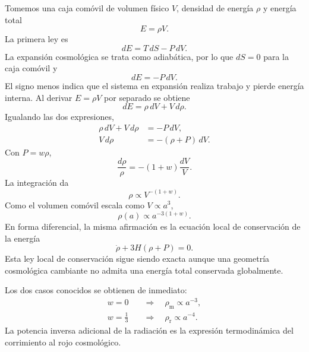 Tomemos una caja comóvil de volumen físico \(V\), densidad de energía \(\rho\) y energía total
\begin{equation}
E=\rho V.
\end{equation}
La primera ley es
\begin{equation}
dE=T\,dS-P\,dV.
\end{equation}
La expansión cosmológica se trata como adiabática, por lo que \(dS=0\) para la caja comóvil y
\begin{equation}
dE=-P\,dV.
\label{eq:c04-adiabatic-first-law}
\end{equation}
El signo menos indica que el sistema en expansión realiza trabajo y pierde energía interna. Al derivar \(E=\rho V\) por separado se obtiene
\begin{equation}
dE=\rho\,dV+V\,d\rho.
\end{equation}
Igualando las dos expresiones,
\begin{align}
\rho\,dV+V\,d\rho&=-P\,dV,\\
V\,d\rho&=-(\rho+P)\,dV.
\label{eq:c04-volume-continuity}
\end{align}
Con \(P=w\rho\),
\begin{equation}
\frac{d\rho}{\rho}=-(1+w)\frac{dV}{V}.
\end{equation}
La integración da
\begin{equation}
\rho\propto V^{-(1+w)}.
\end{equation}
Como el volumen comóvil escala como \(V\propto a^3\),
\begin{equation}
\boxed{\rho(a)\propto a^{-3(1+w)}}.
\label{eq:c04-density-scaling}
\end{equation}
En forma diferencial, la misma afirmación es la ecuación local de conservación de la energía
\begin{equation}
\dot\rho+3H(\rho+P)=0.
\label{eq:c04-continuity}
\end{equation}
Esta ley local de conservación sigue siendo exacta aunque una geometría cosmológica cambiante no admita una energía total conservada globalmente.

Los dos casos conocidos se obtienen de inmediato:
\begin{align}
w=0
&\quad\Longrightarrow\quad
\rho_{\mathrm m}\propto a^{-3},\\
w=\frac13
&\quad\Longrightarrow\quad
\rho_{\mathrm r}\propto a^{-4}.
\end{align}
La potencia inversa adicional de la radiación es la expresión termodinámica del corrimiento al rojo cosmológico.

